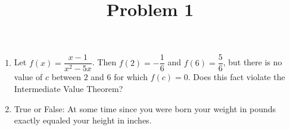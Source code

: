\documentclass{ximera}
\title[Problem 1]{Problem 1}
\begin{document}
\begin{abstract} \end{abstract}
\maketitle

\begin{problem}
	\begin{enumerate}
   	\item  Let $f(x) = \dfrac{x-1}{x^2 - 5x}$.  Then $f(2)=-\dfrac{1}{6}$ and $f(6)=\dfrac{5}{6}$, but there is no value of $c$ between $2$ and $6$ for which $f(c)=0$.  Does this fact violate the Intermediate Value Theorem?
\item	True or False: At some time since you were born your weight in pounds exactly equaled your height in inches.
\end{enumerate}

\end{problem}
\end{document}
